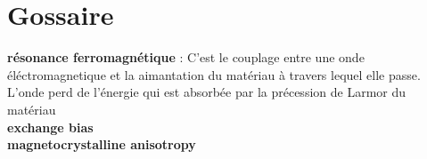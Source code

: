\section*{Gossaire}

\textbf{résonance ferromagnétique} : C'est le couplage entre une onde éléctromagnetique et la aimantation du matériau à travers lequel elle passe. L'onde perd de l'énergie qui est absorbée par la précession de Larmor du matériau\\
\textbf{exchange bias}\\
\textbf{magnetocrystalline anisotropy}